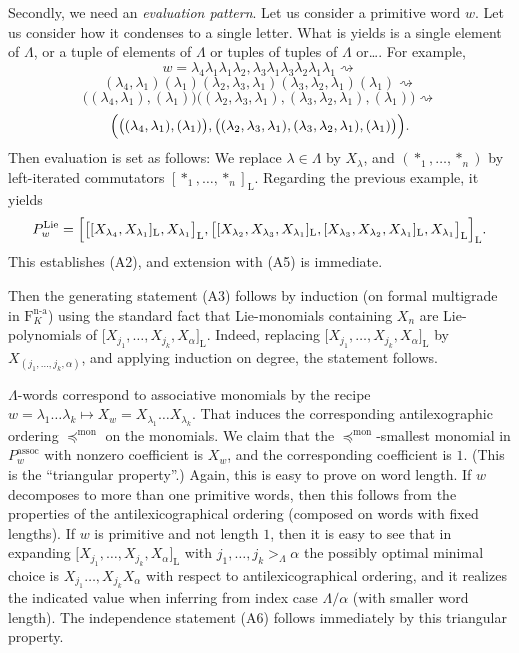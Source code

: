 \documentclass[11pt,a4paper]{amsart}
\DeclareMathOperator{\nonass}{n-a}
\DeclareMathOperator{\Lie}{Lie}
\newcommand{\bo}{\boldsymbol}
\newcommand{\ass}{\mathrm{assoc}}
\theoremstyle{definition}
\theoremstyle{plain}
\begin{document}
Secondly, we need an \textit{evaluation pattern}.
Let us consider a primitive word $w$.
Let us consider how it condenses to a single letter.
What is yields is a single element of $\Lambda$, or a tuple of elements of $\Lambda$ or tuples  of  tuples of $\Lambda$ or\ldots.
For example,
\[  w= \lambda_4\lambda_1 \lambda_1 \lambda_2,\lambda_3    \lambda_1 \lambda_3 \lambda_2    \lambda_1 \lambda_1 \rightsquigarrow\]
\[   (\lambda_4,\lambda_1)(\lambda_1) (\lambda_2,\lambda_3,   \lambda_1)(\lambda_3,\lambda_2   , \lambda_1)(\lambda_1) \rightsquigarrow\]
\[  \bigl( (\lambda_4,\lambda_1),(\lambda_1)\bigr) \bigl((\lambda_2,\lambda_3,
 \lambda_1),(\lambda_3,\lambda_2   , \lambda_1),(\lambda_1)\bigr) \rightsquigarrow\]
\[\Bigl(  \bigl( (\lambda_4,\lambda_1),(\lambda_1)\bigr),\bigl((\lambda_2,\lambda_3,
 \lambda_1),(\lambda_3,\lambda_2   , \lambda_1),(\lambda_1)\bigr)\Bigr) .\]
Then evaluation is set as follows: We replace $\lambda\in\Lambda$ by $X_\lambda$,
 and $(*_1,\ldots,*_n)$ by left-iterated commutators $[ *_1,\ldots,*_n]_{\mathrm L}$.
Regarding the previous example, it yields
\[P^{\Lie}_w=\Bigl[  \bigl[ [X_{\lambda_4},X_{\lambda_1}]_{\mathrm L},
X_{\lambda_1} \bigr]_{\mathrm L},\bigl[[X_{\lambda_2},X_{\lambda_3},   X_{\lambda_1}]_{\mathrm L},
[X_{\lambda_3},X_{\lambda_2}   , X_{\lambda_1}]_{\mathrm L}, X_{\lambda_1} \bigr]_{\mathrm L}\Bigr]_{\mathrm L} .\]
This establishes (A2), and extension with (A5) is immediate.


Then the generating statement (A3) follows by induction (on formal multigrade in $\mathrm F_K^{\nonass}$) using the standard fact that
 Lie-monomials containing $X_n$ are Lie-polynomials of $\bo[X_{j_1}, \ldots,X_{j_k} ,X_\alpha\bo]_{\mathrm L}$.
Indeed, replacing $\bo[X_{j_1}, \ldots,X_{j_k} ,X_\alpha\bo]_{\mathrm L}$ by $X_{(j_1,\ldots,j_k,\alpha )}$,
 and applying induction on degree, the statement follows.

$\Lambda$-words correspond to associative monomials by the recipe
 $w=\lambda_1\ldots\lambda_k\mapsto X_w=X_{\lambda_1}\ldots X_{\lambda_k}$.
That induces the corresponding antilexographic ordering $\preccurlyeq^{\mathrm{mon}}$ on the monomials.
We claim that the $\preccurlyeq^{\mathrm{mon}}$-smallest
 monomial in $P^\ass_w$ with nonzero coefficient is $X_w$, and the corresponding coefficient is $1$.
(This is the ``triangular property''.)
Again, this is easy to prove on word length.
If $w$ decomposes to more than one primitive words, then this follows from the properties of the
 antilexicographical ordering (composed on words with fixed lengths).
If $w$ is primitive and not length $1$, then it is easy to see that in
 expanding   $\bo[X_{j_1}, \ldots,X_{j_k} ,X_\alpha\bo]_{\mathrm L}$ with ${j_1}, \ldots, {j_k}>_\Lambda\alpha$
 the possibly optimal minimal choice is $X_{j_1} \ldots,X_{j_k}X_\alpha$ with respect to
 antilexicographical ordering, and it realizes the indicated value
 when inferring from index case $\Lambda/\alpha$ (with smaller word length).
The independence statement (A6) follows immediately by this triangular property.
\end{document}

